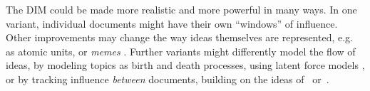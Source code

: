 The DIM could be made more realistic and more powerful in many
ways.  In one variant, individual documents might have their own
``windows'' of influence.  Other improvements may change the way ideas
themselves are represented, e.g. as atomic units, or \emph{memes}
\cite{leskovec:2009}.  Further variants might differently model the
flow of ideas, by modeling topics as birth and death processes, using
latent force models \cite{alvarez:2009}, or by tracking influence
\emph{between} documents, building on the ideas
of~\cite{shaparenko:2007} or~\cite{dietz:2007}. %



